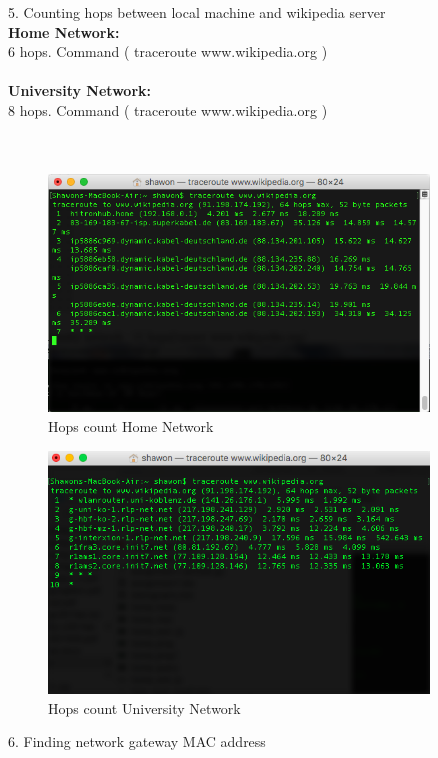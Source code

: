 \documentclass{WeSTassignment}
\begin{document}
\textrm{5. Counting hops between local machine and wikipedia server}\\
\textbf{Home Network:\\}
6 hops. Command ( traceroute www.wikipedia.org )\\ \\
\textbf{University Network:\\}
8 hops. Command ( traceroute www.wikipedia.org )\\ \\ \\
\begin{figure}[bp!]
  \centering
  \includegraphics[width=0.9\textwidth]{home_hops.png}
   \caption{Hops count Home Network}
     \label{fig:hopscount}
\end{figure}
\begin{figure}[bp!]
  \centering
  \includegraphics[width=0.9\textwidth]{uni_hops.png}
   \caption{Hops count University Network}
     \label{fig:hopscount}
\end{figure}
\textrm{6. Finding network gateway MAC address}\\ \\
\end{document}
